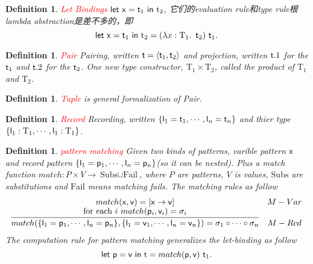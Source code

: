 \documentclass{article}
\theoremstyle{plain}
\newtheorem{definition}[theorem]{Definition}
\theoremstyle{nonumberplain}
\newcommand*{\xfunc}[4]{{#2}\colon{#3}{#1}{#4}}
\newcommand*{\func}[3]{\xfunc{\to}{#1}{#2}{#3}}
\newcommand{\lam}[2]{\ensuremath{\lambda #1\ldotp~ #2}} %
\newcommand{\projone}[1]{\ensuremath{#1.1}}
\newcommand{\projtwo}[1]{\ensuremath{#1.2}}
\newcommand{\singletype}[1]{\text{#1}}
\newcommand{\termtype}[2]{\ensuremath{#1:#2}}
\newcommand{\term}[1]{\ensuremath\mathsf{#1}}
\newcommand{\redt}[1]{\textcolor{red}{#1}}
\begin{document}
\begin{definition}
\rm \redt{Let Bindings} $\term{let}~ \term{x}=\term{t}_1~\term{in}~\text{t}_2$, 它们的evaluation rule和type rule根lambda abstraction是差不多的，即
$$
\term{let}~ \term{x}=\term{t}_1~\term{in}~\text{t}_2 = (\lam{\termtype{x}{\singletype{T}_1}}{\term{t}_2})~\term{t}_1. 
$$
\end{definition}


\begin{definition}
\rm \redt{Pair} Pairing, written $\term{t}=\left<\term{t}_1,\term{t}_2\right>$ and projection, written $\projone{\term{t}}$ for the $\term{t}_1$ and $\projtwo{\term{t}}$ for the $\term{t}_2$. One new type constructor, $\singletype{T}_1 \times \singletype{T}_2$, called the product of $\singletype{T}_1$ and $\singletype{T}_2$.
\end{definition}

\begin{definition}
\rm \redt{Tuple} is general formalization of Pair.
\end{definition}

\begin{definition}
\rm \redt{Record} Recording, written $\{\term{l}_1 =\term{t}_1, \cdots, \term{l}_n =\term{t}_n\}$ and thier type $\{\termtype{\term{l}_1}{\singletype{T}_1}, \cdots, \termtype{\term{l}_1}{\singletype{T}_1}\}$. 
\end{definition}

\begin{definition}
\rm \redt{pattern matching} Given two kinds of patterns, varible pattern $\term{x}$ and record pattern $\{\term{l}_1 =\term{p}_1, \cdots, \term{l}_n =\term{p}_n\}$(so it can be nested). Plus a match function $\func{match}{P \times V}{\text{Subs} \cup \text{Fail}}$, where $P$ are patterns, $V$ is values, $\text{Subs}$ are substitutions and $\text{Fail}$ means matching fails. The matching rules as follow
$$
\begin{array}{cc}
match(\term{x}, \term{v}) = [\term{x} \to \term{v}] & M-Var \\
\infer{match(\{\term{l}_1 =\term{p}_1, \cdots, \term{l}_n =\term{p}_n\}, \{\term{l}_1 =\term{v}_1, \cdots, \term{l}_n =\term{v}_n\}) = \sigma_1 \circ \cdots \circ \sigma_n}{\text{for each}~i~match(\term{p}_i,\term{v}_i)= \sigma_i}& M-Rcd
\end{array}
$$
The computation rule for pattern matching generalizes the let-binding as follow
$$
\term{let}~ \term{p}=\term{v}~\term{in}~\text{t} = match(\term{p},\term{v})~\term{t}_1. 
$$
\end{definition}
\end{document}
